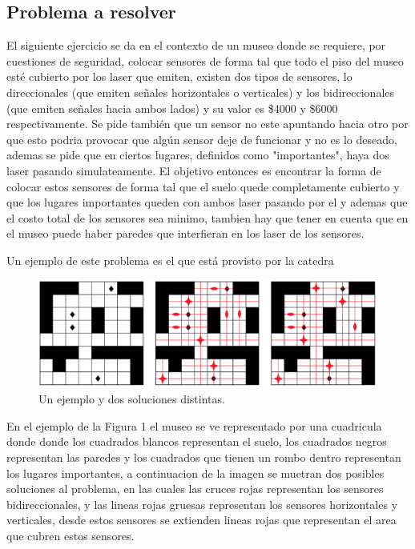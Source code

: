 \subsection{Problema a resolver}

El siguiente ejercicio se da en el contexto de un museo donde se requiere, por cuestiones de seguridad, colocar sensores de forma tal que todo el piso del museo esté cubierto por los laser que emiten, existen dos tipos de sensores, lo direccionales (que emiten señales horizontales o verticales) y los bidireccionales (que emiten señales hacia ambos lados) y su valor es \$4000 y \$6000 respectivamente. Se pide también que un sensor no este apuntando hacia otro por que esto podria provocar que algún sensor deje de funcionar y no es lo deseado, ademas se pide que en ciertos lugares, definidos como "importantes", haya dos laser pasando simulateamente. El objetivo entonces es encontrar la forma de colocar estos sensores de forma tal que el suelo quede completamente cubierto y que los lugares importantes queden con ambos laser pasando por el y ademas que el costo total de los sensores sea minimo, tambien hay que tener en cuenta que en el museo puede haber paredes que interfieran en los laser de los sensores.

Un ejemplo de este problema es el que está provisto por la catedra


\begin{figure}[H]
	\begin{center}
		\includegraphics[width=320pt]{../imgs/ej3_ejemploCatedra.png}
	\end{center}
\caption{Un ejemplo y dos soluciones distintas.}
\end{figure}

En el ejemplo de la Figura 1 el museo se ve representado por una cuadricula donde donde los cuadrados blancos representan el suelo, los cuadrados negros representan las paredes y los cuadrados que tienen un rombo dentro representan los lugares importantes, a continuacion de la imagen se muetran dos posibles soluciones al problema, en las cuales las cruces rojas representan los sensores bidireccionales, y las lineas rojas gruesas representan los sensores horizontales y verticales, desde estos sensores se extienden lineas rojas que representan el area que cubren estos sensores.

